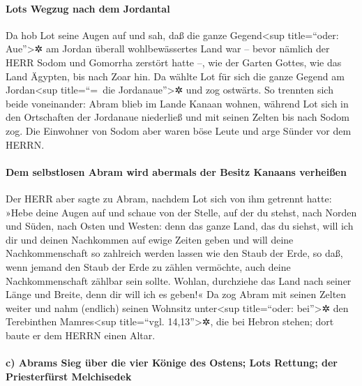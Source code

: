 \hypertarget{lots-wegzug-nach-dem-jordantal}{%
\paragraph{Lots Wegzug nach dem
Jordantal}\label{lots-wegzug-nach-dem-jordantal}}

 Da hob Lot seine Augen auf und sah, daß die ganze
Gegend\textless sup title=``oder: Aue''\textgreater✲ am Jordan überall
wohlbewässertes Land war -- bevor nämlich der HERR Sodom und Gomorrha
zerstört hatte --, wie der Garten Gottes, wie das Land Ägypten, bis nach
Zoar hin.  Da wählte Lot für sich die ganze Gegend am
Jordan\textless sup title=``=~die Jordanaue''\textgreater✲ und zog
ostwärts. So trennten sich beide voneinander:  Abram
blieb im Lande Kanaan wohnen, während Lot sich in den Ortschaften der
Jordanaue niederließ und mit seinen Zelten bis nach Sodom zog.
 Die Einwohner von Sodom aber waren böse Leute und arge
Sünder vor dem HERRN.

\hypertarget{dem-selbstlosen-abram-wird-abermals-der-besitz-kanaans-verheiuxdfen}{%
\paragraph{Dem selbstlosen Abram wird abermals der Besitz Kanaans
verheißen}\label{dem-selbstlosen-abram-wird-abermals-der-besitz-kanaans-verheiuxdfen}}

 Der HERR aber sagte zu Abram, nachdem Lot sich von ihm
getrennt hatte: »Hebe deine Augen auf und schaue von der Stelle, auf der
du stehst, nach Norden und Süden, nach Osten und Westen: 
denn das ganze Land, das du siehst, will ich dir und deinen Nachkommen
auf ewige Zeiten geben  und will deine Nachkommenschaft
so zahlreich werden lassen wie den Staub der Erde, so daß, wenn jemand
den Staub der Erde zu zählen vermöchte, auch deine Nachkommenschaft
zählbar sein sollte.  Wohlan, durchziehe das Land nach
seiner Länge und Breite, denn dir will ich es geben!«  Da
zog Abram mit seinen Zelten weiter und nahm (endlich) seinen Wohnsitz
unter\textless sup title=``oder: bei''\textgreater✲ den Terebinthen
Mamres\textless sup title=``vgl. 14,13''\textgreater✲, die bei Hebron
stehen; dort baute er dem HERRN einen Altar.

\hypertarget{c-abrams-sieg-uxfcber-die-vier-kuxf6nige-des-ostens-lots-rettung-der-priesterfuxfcrst-melchisedek}{%
\paragraph{c) Abrams Sieg über die vier Könige des Ostens; Lots Rettung;
der Priesterfürst
Melchisedek}\label{c-abrams-sieg-uxfcber-die-vier-kuxf6nige-des-ostens-lots-rettung-der-priesterfuxfcrst-melchisedek}}

